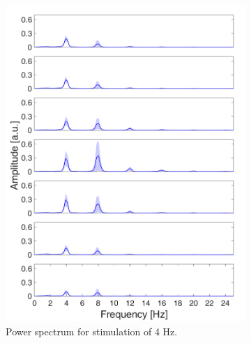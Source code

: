 \documentclass{pracalicmgr}
\begin{document}
	\begin{figure}[H]
	\begin{subfigure}{.5\textwidth}
		\centering
		\includegraphics[width=1.\linewidth]{widmo_4Hz.png}
		\caption{Power spectrum for stimulation of 4 Hz.}
		\label{rys:widmo_4Hz}
	\end{subfigure}
	\begin{subfigure}{.5\textwidth}
		\centering

\end{subfigure}
\end{figure}
\end{document}
